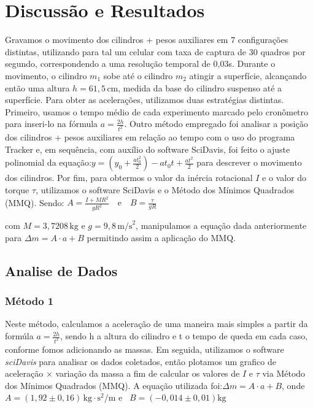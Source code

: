 \documentclass[a4papper, 10pt]{article}
\begin{document}
\section{Discussão e Resultados}
\vspace{0.10 cm}
Gravamos o movimento dos cilindros + pesos auxiliares em 7 configurações distintas, utilizando para tal um celular com taxa de captura de 30 quadros por segundo, correspondendo a uma resolução temporal de 0,03s. Durante o movimento, o cilindro $m_1$ sobe até o cilindro $m_2$ atingir a superfície, alcançando então uma altura $h = 61,5 \, \text{cm}$, medida da base do cilindro suspenso até a superfície. 
Para obter as acelerações, utilizamos duas estratégias distintas. Primeiro, usamos o tempo médio de cada experimento marcado pelo cronômetro para inseri-lo na fórmula $a = \frac{2h}{t^2}$. Outro método empregado foi analisar a posição dos cilindros + pesos auxiliares em relação ao tempo com o uso do programa Tracker e, em sequência, com auxílio do software SciDavis, foi feito o ajuste polinomial da equação:$y = \left(y_0 + \frac{at_0^2}{2}\right) - a t_0 t + \frac{at^2}{2}$
\vspace{0.10 cm}
para descrever o movimento dos cilindros.
Por fim, para obtermos o valor da inércia rotacional $I$ e o valor do torque $\tau$, utilizamos o software SciDavis e o Método dos Mínimos Quadrados (MMQ). Sendo:
$A = \frac{I + MR^2}{gR^2} \quad \text{e} \quad B = \frac{\tau}{g R}$

com $M = 3,7208 \, \text{kg}$ e $g = 9,8 \, \text{m/s}^2$, manipulamos a equação dada anteriormente para
$\Delta m = A \cdot a + B$
permitindo assim a aplicação do MMQ.
\vspace{0.10 cm}
\subsection{Analise de Dados}
\subsubsection{Método 1}
Neste método, calculamos a aceleração de uma maneira mais simples a partir da formúla $a=\frac{2h}{t^{2}}$, sendo h a altura do cilindro e t o tempo de queda em cada caso, conforme fomos adicionando as massas.
Em seguida, utilizamos o software \textit{sciDavis} para analisar os dados coletados, então plotamos um grafico de aceleração $\times$ variação da massa  a fim de calcular os valores de \( I \) e \( \tau \) via Método dos Mínimos Quadrados (MMQ). A equação utilizada foi:$\Delta m = A \cdot a + B$, 
onde $A = (1,92 \pm 0,16) \, \text{kg} \cdot \text{s}^2 / \text{m}$ e \ $B = (- 0,014 \pm 0,01) \text{kg}$
\end{document}
